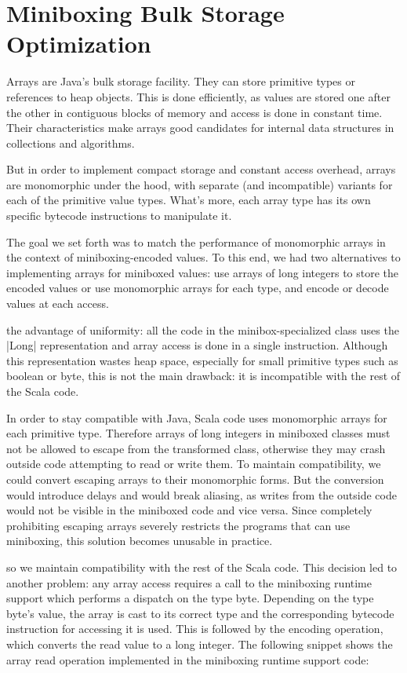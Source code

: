 \section{Miniboxing Bulk Storage Optimization}
\label{mbox:sec-runtime}

Arrays are Java's bulk storage facility. They can store primitive types or references to heap objects. This is done efficiently, as values are stored one after the other in contiguous blocks of memory and access is done in constant time. Their characteristics make arrays good candidates for internal data structures in collections and algorithms.

But in order to implement compact storage and constant access overhead, arrays are monomorphic under the hood, with separate (and incompatible) variants for each of the primitive value types. What's more, each array type has its own specific bytecode instructions to manipulate it.

The goal we set forth was to match the performance of monomorphic arrays in the context of miniboxing-encoded values. To this end, we had two alternatives to implementing arrays for miniboxed values: use arrays of long integers to store the encoded values or use monomorphic arrays for each type, and encode or decode values at each access.

 the advantage of uniformity: all the code in the minibox-specialized class uses the |Long| representation and array access is done in a single instruction. Although this representation wastes heap space, especially for small primitive types such as boolean or byte, this is not the main drawback: it is incompatible with the rest of the Scala code.

In order to stay compatible with Java, Scala code uses monomorphic arrays for each primitive type. Therefore arrays of long integers in miniboxed classes must not be allowed to escape from the transformed class, otherwise they may crash outside code attempting to read or write them. To maintain compatibility, we could convert escaping arrays to their monomorphic forms. But the conversion would introduce delays and would break aliasing, as writes from the outside code would not be visible in the miniboxed code and vice versa. Since completely prohibiting escaping arrays severely restricts the programs that can use miniboxing, this solution becomes unusable in practice.

 so we maintain compatibility with the rest of the Scala code. This decision led to another problem: any array access requires a call to the miniboxing runtime support which performs a dispatch on the type byte. Depending on the type byte's value, the array is cast to its correct type and the corresponding bytecode instruction for accessing it is used. This is followed by the encoding operation, which converts the read value to a long integer. The following snippet shows the array read operation implemented in the miniboxing runtime support code:

